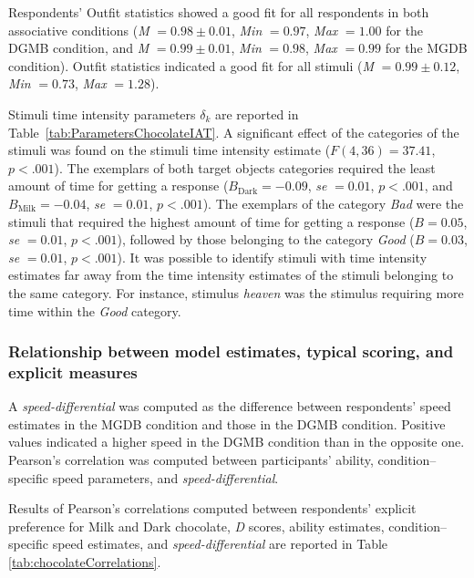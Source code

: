 \documentclass[12pt]{book}
\begin{document}
Respondents’ Outfit statistics showed a good fit for all respondents in both associative conditions (\emph{M} $= 0.98 \pm 0.01$, \emph{Min} $= 0.97$, \emph{Max} $= 1.00$ for the DGMB condition, and \emph{M} $= 0.99 \pm 0.01$, \emph{Min} $=
0.98$, \emph{Max} $= 0.99$ for the MGDB condition). Outfit statistics indicated a good fit for all stimuli (\emph{M} $= 0.99 \pm 0.12$, \emph{Min} $= 0.73$, \emph{Max} $= 1.28$). 


Stimuli time intensity parameters $\delta_k$ are reported in Table~\ref{tab:ParametersChocolateIAT}.     
A significant effect of the categories of the stimuli was found on the stimuli time intensity estimate ($F(4,36)=37.41$, $p < .001$). The exemplars of both target objects categories required the least amount of time for getting a response ($B_{\text{Dark}} = -0.09$, \emph{se} $= 0.01$, $p < .001$, and $B_{\text{Milk}} = -0.04$, \emph{se} $= 0.01$, $p < .001$). 
The exemplars of the category \emph{Bad} were the stimuli that required the highest amount of time for getting a response ($B = 0.05$, \emph{se} $= 0.01$, $p < .001$), followed by those belonging to the category \emph{Good} ($B = 0.03$, \emph{se} $= 0.01$, $p < .001$).
 It was possible to identify stimuli with time intensity estimates far away from the time intensity estimates of the stimuli belonging to the same category. For instance, stimulus \emph{heaven} was the stimulus requiring more time within the \emph{Good} category.



\subsubsection{Relationship between model estimates, typical scoring, and explicit measures}

A \emph{speed-differential} was computed as the difference between respondents' speed estimates in the MGDB condition and those in the DGMB condition. 
Positive values indicated a higher speed in the DGMB condition than in the opposite one. Pearson's correlation was computed between participants' ability, condition--specific speed parameters, and \emph{speed-differential}.

Results of Pearson's correlations computed between respondents' explicit preference for Milk and Dark chocolate, \emph{D} scores, ability estimates, condition--specific speed estimates, and \emph{speed-differential} are reported in Table \ref{tab:chocolateCorrelations}.
\end{document}
